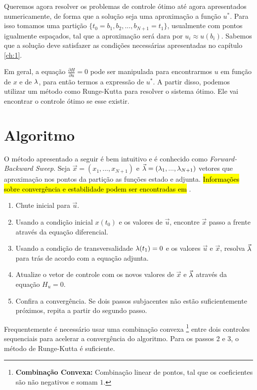 Queremos agora resolver os problemas de controle ótimo até agora apresentados
numericamente, de forma que a solução seja uma aproximação a função $u^*$.
Para isso tomamos uma partição $\{t_0 = b_1, b_2, ..., b_{N+1} = t_1\}$,
usualmente com pontos igualmente espaçados, tal que a aproximação será dara
por $u_i \approx u(b_i)$. Sabemos que a solução deve satisfazer as condições
necessárias apresentadas no capítulo \ref{ch:1}. 

Em geral, a equação $\frac{\partial H}{\partial u} = 0$ pode ser manipulada
para encontrarmos $u$ em função de $x$ e de $\lambda$, para então termos a
expressão de $u^*$. A partir disso, podemos utilizar um método como
Runge-Kutta para resolver o sistema ótimo. Ele vai encontrar o controle ótimo
se esse existir. 

\section{Algoritmo}

O método apresentado a seguir é bem intuitivo e é conhecido como
\textit{Forward-Backward Sweep}. Seja $\vec{x} = (x_1,...,x_{N+1})$ e
$\vec{\lambda} = (\lambda_1, ..., \lambda_{N+1})$ vetores que aproximação nos pontos da
partição as funções estado e adjunta. \hl{Informa\c{c}\~oes sobre converg\^encia e
estabilidade podem ser encontradas em} \cite{wolfgang1978}. 

\begin{enumerate}
    \item Chute inicial para $\vec{u}$. 
    \item Usando a condição inicial $x(t_0)$ e os valores de $\vec{u}$,
    encontre $\vec{x}$ passo a frente através da equação diferencial. 
    \item Usando a condição de transversalidade $\lambda(t_1) = 0$ e os valores
    $\vec{u}$ e $\vec{x}$, resolva $\vec{\lambda}$ para trás de acordo com a
    equação adjunta. 
    \item Atualize o vetor de controle com os novos valores de $\vec{x}$ e
    $\vec{\lambda}$ através da equação $H_u = 0$. 
    \item Confira a convergência. Se dois passos subjacentes não estão
    suficientemente próximos, repita a partir do segundo passo. 
\end{enumerate}

Frequentemente é necessário usar uma combinação convexa \footnote{\textbf{Combinação Convexa:} Combinação linear de pontos, tal que os
coeficientes são não negativos e somam $1$.} entre dois controles
sequenciais para acelerar a convergência do algoritmo. Para os passos 2 e 3, o
método de Runge-Kutta é suficiente. 


